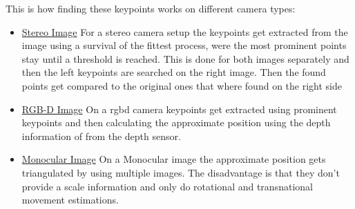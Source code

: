 This is how finding these keypoints works on different camera types:
\begin{itemize}
    \item \underline{Stereo Image} \newline
    For a stereo camera setup the keypoints get extracted from the image using a survival of the fittest process, were the most prominent points stay until a threshold is reached. This is done for both images separately and then the left keypoints are searched on the right image. Then the found points get compared to the original ones that where found on the right side
    \item \underline{RGB-D Image} \newline
    On a \gls{rgbd} camera keypoints get extracted using prominent keypoints and then calculating the approximate position using the depth information of from the depth sensor.
    \item \underline{Monocular Image} \newline
    On a Monocular image the approximate position gets triangulated by using multiple images. The disadvantage is that they don't provide a scale information and only do rotational and transnational movement estimations.
\end{itemize}

